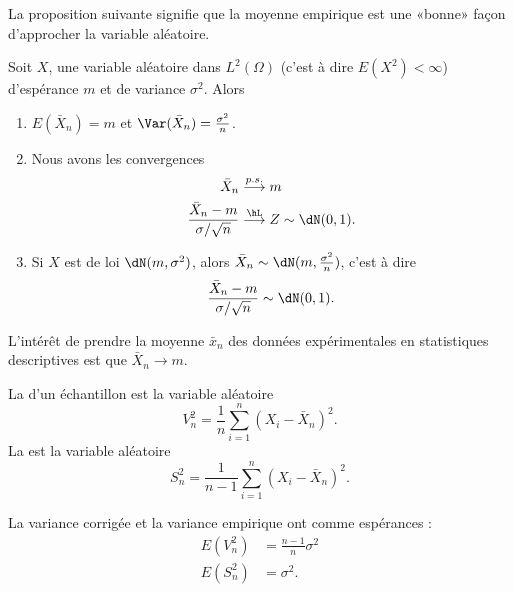 La proposition suivante signifie que la moyenne empirique est une «bonne» façon d'approcher la variable aléatoire.
\begin{proposition}
    Soit \( X\), une variable aléatoire dans \( L^2(\Omega)\) (c'est à dire \( E(X^2)<\infty\)) d'espérance \( m\) et de variance \( \sigma^2\). Alors
    \begin{enumerate}
        \item
            \( E(\bar X_n)=m\) et \( \Var(\bar X_n)=\frac{ \sigma^2 }{ n }\).
        \item
            Nous avons les convergences
            \begin{subequations}
                \begin{align}
                    \bar X_n&\stackrel{p.s.}{\longrightarrow} m\\
                    \frac{ \bar X_n-m }{ \sigma/\sqrt{n} }&\stackrel{\hL}{\longrightarrow} Z\sim\dN(0,1).
                \end{align}
            \end{subequations}
        \item
            Si \( X\) est de loi \( \dN(m,\sigma^2)\), alors \( \bar X_n\sim\dN(m,\frac{ \sigma^2 }{ n })\), c'est à dire
            \begin{equation}
                \frac{ \bar X_n -m}{ \sigma/\sqrt{n} }\sim\dN(0,1).
            \end{equation}
            
            
    \end{enumerate}
    
\end{proposition}
L'intérêt de prendre la moyenne \( \bar x_n\) des données expérimentales en statistiques descriptives est que \( \bar X_n\to m\).

La  d'un échantillon est la variable aléatoire
\begin{equation}
    V_n^2=\frac{1}{ n }\sum_{i=1}^n(X_i-\bar X_n)^2.
\end{equation}
La  est la variable aléatoire 
\begin{equation}        \label{Eqdefvarempicorri}
    S_n^2=\frac{1}{ n-1 }\sum_{i=1}^n(X_i-\bar X_n)^2.
\end{equation}

\begin{lemma}
    La variance corrigée et la variance empirique ont comme espérances :
    \begin{subequations}
        \begin{align}
            E(V_n^2)&=\frac{ n-1 }{ n }\sigma^2\\
            E(S_n^2)&=\sigma^2.
        \end{align}
    \end{subequations}
\end{lemma}

